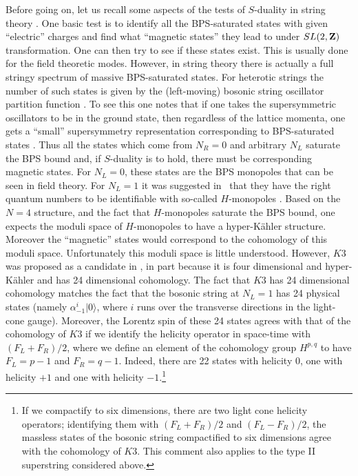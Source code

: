 \documentclass[12pt]{article}
\numberwithin{equation}{section}
\begin{document}
Before going on, let us recall some aspects of
the tests of $S$-duality in string theory \cite{seni}.
One basic test is to identify all the BPS-saturated
states with given ``electric'' charges  and find
what ``magnetic states'' they lead to under $SL(2,{\bf Z})$ transformation. One
can then try to see if these states exist.
This is usually done for the field theoretic modes.  However,
in string theory there is actually a full stringy spectrum of
massive BPS-saturated states.
For heterotic
strings the number of such states is given by the (left-moving)
bosonic string oscillator partition function
\cite{atha}.
To see this one notes that if one takes the supersymmetric oscillators
to be in the ground state, then regardless of the lattice momenta,
one gets a ``small'' supersymmetry representation corresponding to
BPS-saturated states \cite{wo}.  Thus all the states which come from
$N_R=0$ and arbitrary $N_L$ saturate the BPS bound and, if $S$-duality
is to hold, there must be corresponding magnetic
states.  For $N_L=0$, these states are the BPS monopoles that can be seen
in field theory.  For $N_L=1$ it
was suggested in \cite{seni}\ that they have the right quantum
numbers to be identifiable with so-called
$H$-monopoles
\cite{khur,haret}.
Based on the $N=4$ structure, and the fact that
$H$-monopoles saturate the BPS bound, one expects the moduli space
of $H$-monopoles
to have a hyper-K\"ahler structure.  Moreover the ``magnetic''
states would correspond to the cohomology of this moduli space.
Unfortunately this moduli space is little understood.
However, $K3$ was proposed as a candidate in \cite{harre},
in part because it is four dimensional and hyper-K\"ahler and
has 24 dimensional cohomology.
The fact that $K3$ has 24 dimensional cohomology
matches the fact that the bosonic string at $N_L=1$ has
24 physical states (namely $\alpha_{-1}^i|0\rangle$, where
$i$ runs over the transverse directions in the light-cone gauge).
Moreover, the Lorentz spin of these 24 states agrees with that of
the cohomology of $K3$
if we identify the helicity operator in space-time
with $(F_L+F_R)/2$, where we define an element
of the cohomology group $H^{p,q}$ to have $F_L=p-1$ and $F_R=q-1$.
Indeed, there are 22 states with helicity 0, one with helicity
$+1$ and one with helicity $-1$.\footnote{If we compactify to six
  dimensions, there are two light cone helicity operators; identifying
  them with $(F_L+F_R)/2$ and $(F_L-F_R)/2$, the massless states of the
  bosonic string compactified to six dimensions agree with the
  cohomology of $K3$. This comment also applies to the type II
superstring considered above.}
\end{document}
